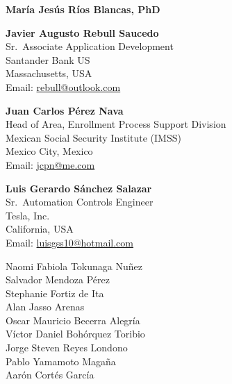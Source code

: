 \documentclass[12pt,a4paper]{article}
\begin{document}
\vspace{0.4cm}

\noindent\textbf{María Jesús Ríos Blancas, PhD}

\vspace{0.4cm}

\noindent\textbf{Javier Augusto Rebull Saucedo}\\
Sr.\ Associate Application Development\\
Santander Bank US\\
Massachusetts, USA\\
Email: \href{mailto:rebull@outlook.com}{rebull@outlook.com}

\vspace{0.4cm}

\noindent\textbf{Juan Carlos Pérez Nava}\\
Head of Area, Enrollment Process Support Division\\
Mexican Social Security Institute (IMSS)\\
Mexico City, Mexico\\
Email: \href{mailto:jcpn@me.com}{jcpn@me.com}

\vspace{0.4cm}

\noindent\textbf{Luis Gerardo Sánchez Salazar}\\
Sr.\ Automation Controls Engineer\\
Tesla, Inc.\\
California, USA\\
Email: \href{mailto:luisgss10@hotmail.com}{luisgss10@hotmail.com}

\vspace{0.4cm}

\noindent Naomi Fabiola Tokunaga Nuñez\\
Salvador Mendoza Pérez\\
Stephanie Fortiz de Ita\\
Alan Jasso Arenas\\
Oscar Mauricio Becerra Alegría\\
Víctor Daniel Bohórquez Toribio\\
Jorge Steven Reyes Londono\\
Pablo Yamamoto Magaña\\
Aarón Cortés García

\vspace{1cm}

\end{document}
